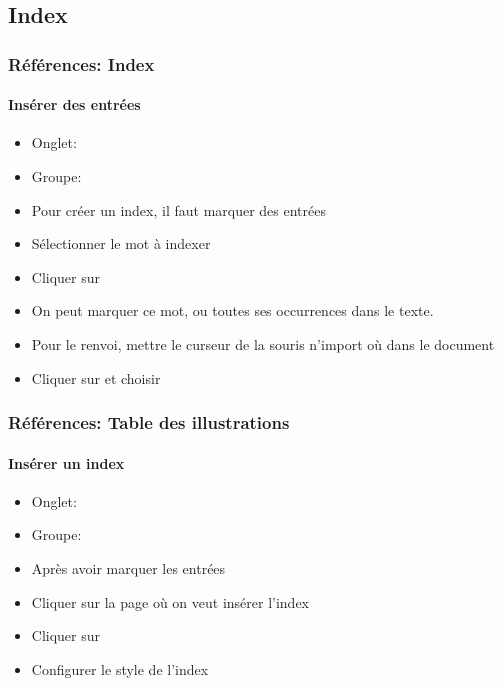 \documentclass[xcolor=table]{beamer}
\begin{document}
\subsection{Index}

\begin{frame}[t]
\frametitle{Références: Index}
\framesubtitle{Insérer des entrées}

\begin{minipage}{0.69\textwidth}
\begin{itemize}
	\item Onglet: 
	\item Groupe: 
	\item Pour créer un index, il faut marquer des entrées 
	\item Sélectionner le mot à indexer 
	\item Cliquer sur 
	\item On peut marquer ce mot, ou toutes ses occurrences dans le texte.
	\item Pour le renvoi, mettre le curseur de la  souris n'import où dans le document 
	\item Cliquer sur  et choisir 
\end{itemize}
\end{minipage}
\begin{minipage}{0.30\textwidth}


\end{minipage}

\end{frame}

\begin{frame}[t]
\frametitle{Références: Table des illustrations}
\framesubtitle{Insérer un index}

\begin{minipage}{0.61\textwidth}
\begin{itemize}
	\item Onglet: 
	\item Groupe: 
	\item Après avoir marquer les entrées
	\item Cliquer sur la page où on veut insérer l'index
	\item Cliquer sur 
	\item Configurer le style de l'index
\end{itemize}
\end{minipage}
\begin{minipage}{0.38\textwidth}


\end{minipage}

\end{frame}
\end{document}
